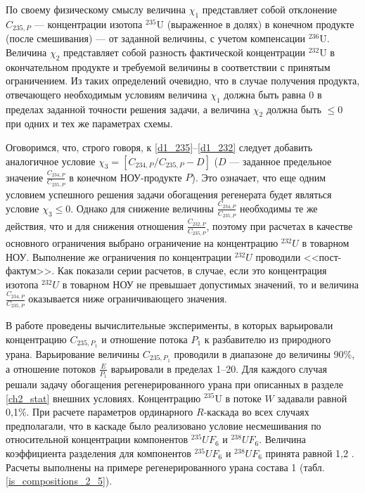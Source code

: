 По своему физическому смыслу величина $\chi_1$ представляет собой отклонение  $C_{235, P}$ --- концентрации изотопа $^{235}$U (выраженное в долях) в конечном продукте (после смешивания) --- от заданной величины, с учетом компенсации $^{236}$U. Величина $\chi_2$ представляет собой разность фактической концентрации $^{232}$U в окончательном продукте и требуемой величины в соответствии с принятым ограничением. Из таких определений очевидно, что в случае получения продукта, отвечающего необходимым условиям величина $\chi_1$ должна быть равна 0 в пределах заданной точности решения задачи, а величина $\chi_2$ должна быть $\leq0$ при одних и тех же параметрах схемы. 

Оговоримся, что, строго говоря, к \ref{d1_235}--\ref{d1_232} следует добавить аналогичное условие $\chi_3=\left[C_{234,P}/C_{235,P}-D\right]$ ($D$ --- заданное предельное значение $\frac{C_{234,P}}{C_{235,P}}$ в конечном НОУ-продукте $P$). Это означает, что еще одним условием успешного решения задачи обогащения регенерата будет являться условие $\chi_3 \leq0$. Однако для снижение величины $\frac{C_{234,P}}{C_{235,P}}$ необходимы те же действия, что и для снижения отношения $\frac{C_{232,P}}{C_{235,P}}$, поэтому при расчетах в качестве основного ограничения выбрано ограничение на концентрацию $^{232}U$ в товарном НОУ. Выполнение же ограничения по концентрации $^{232}U$ проводили <<пост-фактум>>. Как показали серии расчетов, в случае, если это концентрация изотопа $^{232}U$ в товарном НОУ не превышает допустимых значений, то и величина $\frac{C_{234,P}}{C_{235,P}}$ оказывается ниже ограничивающего значения.

В работе проведены вычислительные эксперименты, в которых варьировали концентрацию $C_{235, P_1}$ и отношение потока $P_1$ к разбавителю из природного урана. Варьирование величины $C_{235, P_1}$ проводили в диапазоне до величины 90\%, а отношение потоков $\frac{E}{P_1}$ варьировали в пределах 1--20. Для каждого случая решали задачу обогащения регенерированного урана при описанных в разделе \ref{ch2_stat} внешних условиях. Концентрацию $^{235}$U в потоке $W$ задавали равной 0,1\%. При расчете параметров ординарного $R$-каскада во всех случаях предполагали, что в каскаде было реализовано условие несмешивания по относительной концентрации компонентов $^{235}UF_6$ и $^{238}UF_6$. Величина коэффициента разделения для компонентов  $^{235}UF_6$ и $^{238}UF_6$ принята равной 1,2 \cite{smirnovEvolutionIsotopicComposition2012}. Расчеты выполнены на примере регенерированного урана состава 1 (табл. \ref{is_compositions_2_5}).


